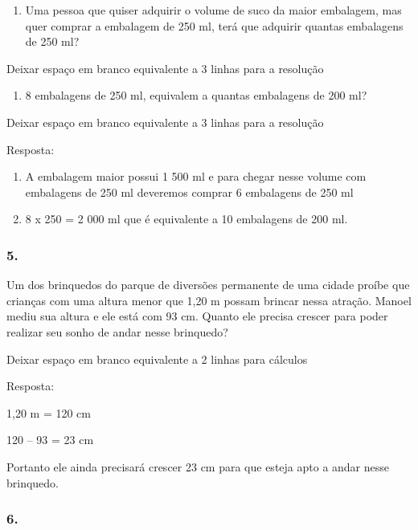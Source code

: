 \begin{enumerate}
\def\labelenumi{\alph{enumi})}
\item
  Uma pessoa que quiser adquirir o volume de suco da maior embalagem,
  mas quer comprar a embalagem de 250 ml, terá que adquirir quantas
  embalagens de 250 ml?
\end{enumerate}

Deixar espaço em branco equivalente a 3 linhas para a resolução

\begin{enumerate}
\def\labelenumi{\alph{enumi})}
\item
  8 embalagens de 250 ml, equivalem a quantas embalagens de 200 ml?
\end{enumerate}

Deixar espaço em branco equivalente a 3 linhas para a resolução

Resposta:

\begin{enumerate}
\def\labelenumi{\alph{enumi})}
\item
  A embalagem maior possui 1 500 ml e para chegar nesse volume com
  embalagens de 250 ml deveremos comprar 6 embalagens de 250 ml
\item
  8 x 250 = 2 000 ml que é equivalente a 10 embalagens de 200 ml.
\end{enumerate}

\subsubsection{5.}\label{section-43}

Um dos brinquedos do parque de diversões permanente de uma cidade proíbe
que crianças com uma altura menor que 1,20 m possam brincar nessa
atração. Manoel mediu sua altura e ele está com 93 cm. Quanto ele
precisa crescer para poder realizar seu sonho de andar nesse brinquedo?

Deixar espaço em branco equivalente a 2 linhas para cálculos

Resposta:

1,20 m = 120 cm

120 -- 93 = 23 cm

Portanto ele ainda precisará crescer 23 cm para que esteja apto a andar
nesse brinquedo.

\subsubsection{6.}\label{section-44}

